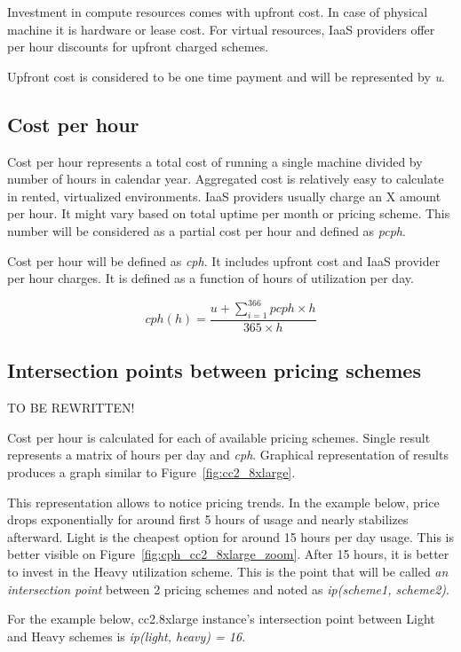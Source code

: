 \documentclass[]{final_report}
\begin{document}
Investment in compute resources comes with upfront cost. In case of physical machine it is hardware or lease cost. For virtual resources, IaaS providers offer per hour discounts for upfront charged schemes. \par
Upfront cost is considered to be one time payment and will be represented by \textit{u}. 

\subsection{Cost per hour}

Cost per hour represents a total cost of running a single machine divided by number of hours in calendar year. Aggregated cost is relatively easy to calculate in rented, virtualized environments. IaaS providers usually charge an X amount per hour. It might vary based on total uptime per month or pricing scheme. This number will be considered as a partial cost per hour and defined as \textit{pcph}. \par
Cost per hour will be defined as \textit{cph}. It includes upfront cost and IaaS provider per hour charges. It is defined as a function of hours of utilization per day.  

\begin{equation}
\label{eq:cph}
cph(h) = \frac{u + \sum_{i=1}^{366} pcph \times h}{365 \times h}
\end{equation}

\subsection{Intersection points between pricing schemes}

TO BE REWRITTEN!

Cost per hour is calculated for each of available pricing schemes. Single result represents a matrix of hours per day and \textit{cph}. Graphical representation of results produces a graph similar to Figure~\ref{fig:cc2_8xlarge}. \par 
This representation allows to notice pricing trends. In the example below, price drops exponentially for around first 5 hours of usage and nearly stabilizes afterward. Light is the cheapest option for around 15 hours per day usage. This is better visible on Figure~\ref{fig:cph_cc2_8xlarge_zoom}. After 15 hours, it is better to invest in the Heavy utilization scheme. This is the point that will be called \textit{an intersection point} between 2 pricing schemes and noted as \textit{ip(scheme1, scheme2)}. \par
For the example below, cc2.8xlarge instance's intersection point between Light and Heavy schemes is \textit{ip(light, heavy) = 16}.
\end{document}

